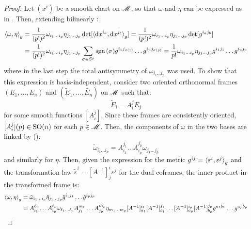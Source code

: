 \begin{proofbox}
  \begin{proof}
    Let $ (x^i) $ be a smooth chart on $ \mathscr{M} $, so that $ \omega $ and $ \eta $ can be expressed as in . Then, extending bilinearly :
    \begin{equation*}
      \begin{split}
        \braket{\omega , \eta}_g
        & = \frac{1}{(p!)^2} \omega_{i_1 \dots i_p} \eta_{j_1 \dots j_p} \det[\braket{\mathrm{d} x^{i_a} , \mathrm{d} x^{j_b}}_g] = \frac{1}{(p!)^2} \omega_{i_1 \dots i_p} \eta_{j_1 \dots j_p} \det[g^{i_a j_b}] \\
        & = \frac{1}{(p!)^2} \omega_{i_1 \dots i_p} \eta_{j_1 \dots j_p} \sum_{\sigma \in S^{p}} \mathrm{sgn}\,(\sigma) g^{i_1 j_{\sigma(1)}} \dots g^{i_p j_{\sigma(p)}} = \frac{1}{p!} \omega_{i_1 \dots i_p} \eta_{j_1 \dots j_p} g^{i_1 j_1} \dots g^{i_p j_p}
      \end{split}
    \end{equation*}
    where in the last step the total antisymmetry of $ \omega_{i_1 \dots i_p} $ was used. To show that this expression is basis-independent, consider two oriented orthonormal frames $ (E_1 , \dots , E_n) $ and $ (\tilde{E}_1 , \dots , \tilde{E_n}) $ on $ \mathscr{M} $ such that:
    \begin{equation*}
      \tilde{E}_i = A^j_i E_j
    \end{equation*}
    for some smooth functions $ [A^j_i] $. Since these frames are consistently oriented, $ [A^j_i](p) \in \mathrm{SO}(n) $ for each $ p \in \mathscr{M} $. Then, the components of $ \omega $ in the two bases are linked by ():
    \begin{equation*}
      \tilde{\omega}_{i_1 \dots i_p} = A^{j_1}_{i_1} \dots A^{j_p}_{i_p} \omega_{j_1 \dots j_p}
    \end{equation*}
    and similarly for $ \eta $. Then, given the expression for the metric $ g^{ij} = \braket{\varepsilon^i , \varepsilon^j}_g $ and the transformation law $ \tilde{\varepsilon}^i = [A^{-1}]^i_j \varepsilon^j $ for the dual coframes, the inner product in the transformed frame is:
    \begin{equation*}
      \begin{split}
        \braket{\omega , \eta}_g
        & = \tilde{\omega}_{i_1 \dots i_p} \tilde{\eta}_{j_1 \dots j_p} \tilde{g}^{i_1 j_1} \dots \tilde{g}^{i_p j_p} \\
        & = A^{\ell_1}_{i_1} \dots A^{\ell_p}_{i_p} \omega_{\ell_1 \dots \ell_p} A^{m_1}_{j_1} \dots A^{m_p}_{j_p} \eta_{m_1 \dots m_p} [A^{-1}]^{i_1}_{a_1} [A^{-1}]^{j_1}_{b_1} \dots [A^{-1}]^{i_p}_{a_p} [A^{-1}]^{j_p}_{b_p} g^{a_1 b_1} \dots g^{a_p b_p} \\

\end{split}
\end{equation*}
\end{proof}
\end{proofbox}
